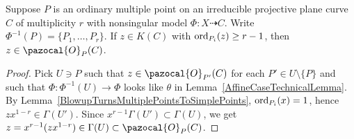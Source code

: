     \begin{lemma}
        Suppose $P$ is an ordinary multiple point on an irreducible projective plane curve $C$ of multiplicity $r$ with nonsingular model $\Phi:X\dashrightarrow C$. Write $\Phi^{-1}(P)=\{P_1,\dots,P_r\}$. If $z\in K(C)$ with $\mathrm{ord}_{P_i}(z)\geq r-1$, then $z\in \pazocal{O}_P(C)$. 
    \end{lemma}
    \begin{proof}
        Pick $U\ni P$ such that $z\in \pazocal{O}_{P'}(C)$ for each $P'\in U\setminus \{P\}$ and such that $\Phi: \Phi^{-1}(U)\rightarrow \Phi$ looks like $\theta$ in Lemma~\ref{AffineCaseTechnicalLemma}. By Lemma~\ref{BlowupTurnsMultiplePointsToSimplePoints}, $\mathrm{ord}_{P_i}(x)=1$, hence $zx^{1-r}\in \Gamma(U')$. Since $x^{r-1}\Gamma(U')\subset \Gamma(U)$, we get $z=x^{r-1}(zx^{1-r})\in \Gamma(U)\subset \pazocal{O}_P(C)$.
    \end{proof}

